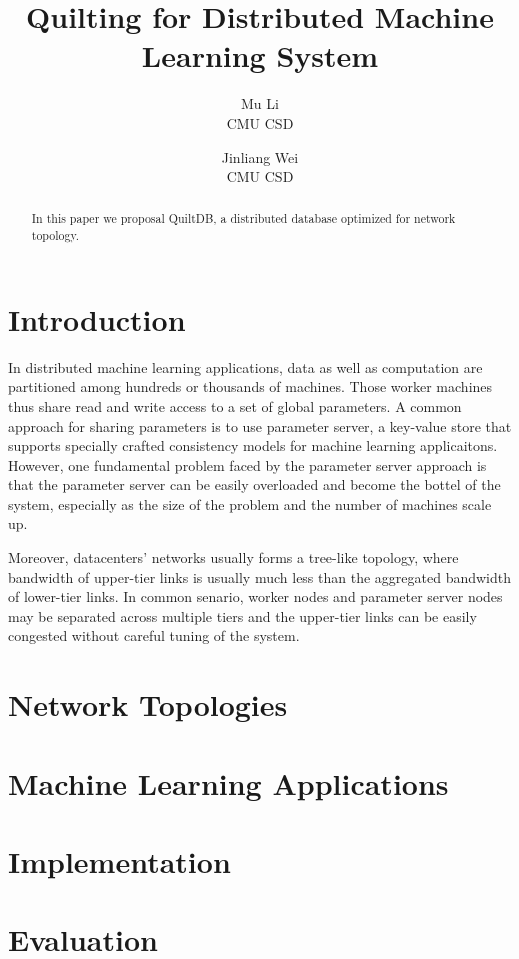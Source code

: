 \documentclass{acm_proc_article-sp}
\title{Quilting for Distributed Machine Learning System}
\author{Mu Li \\ CMU CSD \and Jinliang Wei\\ CMU CSD}
\begin{document}
\maketitle

\begin{abstract}
In this paper we proposal QuiltDB, a distributed database optimized for network
topology.
\end{abstract}

\section{Introduction}

In distributed machine learning applications, data as well as computation are
partitioned among hundreds or  thousands of machines. Those
worker machines thus share read and write access to a set of global parameters.
A common approach for sharing parameters is to use parameter server, a key-value
store that supports specially crafted consistency models for machine learning
applicaitons. However, one fundamental problem faced by the parameter server
approach is that the parameter server can be easily overloaded and become the
bottel of the system, especially as the size of the problem and the number of
machines scale up.

Moreover, datacenters' networks usually forms a tree-like topology,
where bandwidth of upper-tier links is usually much less than the aggregated
bandwidth of lower-tier links. In common senario, worker nodes and parameter
server nodes may be separated across multiple tiers and the upper-tier links can
be easily congested without careful tuning of the system.

\section{Network Topologies}

\section{Machine Learning Applications}
\section{Implementation}

\section{Evaluation}
\end{document}
